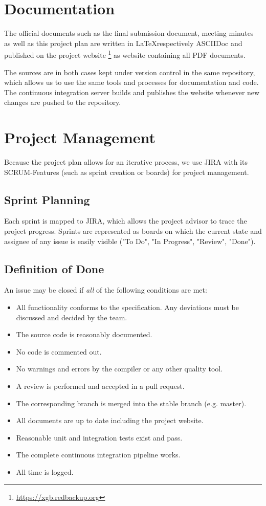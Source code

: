 \section{Documentation}
The official documents such as the final submission document, meeting minutes as well as this project plan are written in \LaTeX respectively ASCIIDoc and published on the project website \footnote{\url{https://xgb.redbackup.org}} as website containing all PDF documents.

The sources are in both cases kept under version control in the same repository, which allows us to use the same tools and processes for documentation and code. The continuous integration server builds and publishes the website whenever new changes are pushed to the repository.

\section{Project Management}
Because the project plan allows for an iterative process, we use JIRA with its SCRUM-Features (such as sprint creation or boards) for project management.

\subsection{Sprint Planning}
Each sprint is mapped to JIRA, which allows the project advisor to trace the project progress. Sprints are represented as boards on which the current state and assignee of any issue is easily visible ("To Do", "In Progress", "Review", "Done").


\subsection{Definition of Done}
An issue may be closed if \emph{all} of the following conditions are met:

\begin{itemize}
    \item All functionality conforms to the specification. Any deviations must be discussed and decided by the team.
    \item The source code is reasonably documented.
    \item No code is commented out.
    \item No warnings and errors by the compiler or any other quality tool.
    \item A review is performed and accepted in a pull request.
    \item The corresponding branch is merged into the stable branch (e.g. master).
    \item All documents are up to date including the project website.
    \item Reasonable unit and integration tests exist and pass.
    \item The complete continuous integration pipeline works.
    \item All time is logged.
\end{itemize}

